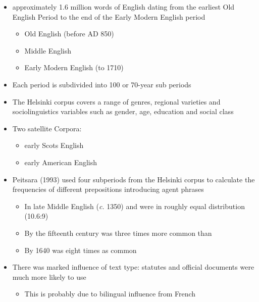 \documentclass[a4paper,landscape,headrule,footrule,dvips]{foils}
\begin{document}
\begin{CJK}{UTF8}{min}
\begin{itemize}
\item approximately 1.6 million words of English dating from the earliest Old English Period to the end of the Early Modern English period 
  \begin{itemize}
  \item Old English (before AD 850)
  \item Middle English
  \item Early Modern English (to 1710)
  \end{itemize}
\item Each period is subdivided into  100 or 70-year sub periods
\item The Helsinki corpus covers a range of genres, regional varieties and sociolinguistics variables such as gender, age, education and social class
\item Two satellite Corpora:
  \begin{itemize}
  \item early Scots English
  \item early American English
  \end{itemize}
\end{itemize}  



\begin{itemize}
\item  Peitsara (1993) used four subperiods from the Helsinki corpus to calculate the frequencies of different prepositions introducing agent phrases
  \begin{itemize}
  \item In late Middle English (\textit{c.} 1350)  and
     were in roughly equal distribution (10.6:9)
  \item By the fifteenth century  was three times more
    common than 
  \item By 1640  was eight times as common
  \end{itemize}
\item There was marked influence of text type: statutes and official
  documents were much more likely to use 
  \begin{itemize}
  \item This is probably due to bilingual influence from French
  \end{itemize}
\end{itemize}



\end{CJK}
\end{document}
